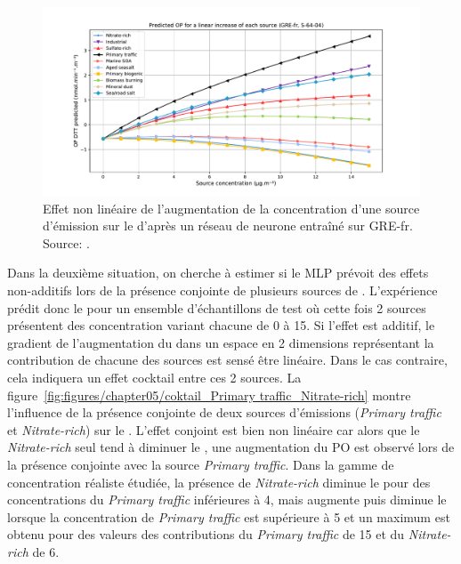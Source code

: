 \begin{figure}[ht]
    \centering
    \includegraphics[width=0.9\linewidth]{figures/chapter05/prediction_other_0_softplus-64-0.4.pdf}
    \caption{Effet non linéaire de l'augmentation de la concentration d'une source
        d'émission sur le \PODTTv{} d'après un réseau de neurone entraîné sur GRE-fr. Source: \cite{fichesMachine2020}.}%
    \label{fig:figures/chapter05/10sourcesLinearite}
\end{figure}

Dans la deuxième situation, on cherche à estimer si le MLP prévoit des effets non-additifs
lors de la présence conjointe de plusieurs sources de \PMdix. L'expérience prédit donc le
\PODTTv{} pour un ensemble d'échantillons de test où cette fois 2 sources présentent des
concentration variant chacune de 0 à \SI{15}{\ugm}.
Si l'effet est additif, le gradient de l'augmentation du \PODTTv{} dans un espace en
2 dimensions représentant la contribution de chacune des sources est sensé être linéaire.
Dans le cas contraire, cela indiquera un effet cocktail entre ces 2 sources.
La figure~\ref{fig:figures/chapter05/coktail_Primary traffic_Nitrate-rich} montre
l'influence de la présence conjointe de deux sources d'émissions (\textit{Primary traffic}
et \textit{Nitrate-rich}) sur le \PODTTv. L'effet conjoint est bien non linéaire car alors
que le \textit{Nitrate-rich} seul tend à diminuer le \PODTTv, une augmentation du PO est
observé lors de la présence conjointe avec la source \textit{Primary traffic}. Dans la gamme de
concentration réaliste étudiée, la présence de \textit{Nitrate-rich} diminue le \PODTTv{}
pour des concentrations du \textit{Primary traffic} inférieures à \SI{4}{\ugm}, mais
augmente puis diminue le \PODTTv{} lorsque la concentration de \textit{Primary traffic} est
supérieure à \SI{5}{\ugm} et un maximum est obtenu pour des valeurs des contributions du
\textit{Primary traffic} de \SI{15}{\ugm} et du \textit{Nitrate-rich} de \SI{6}{\ugm}.


